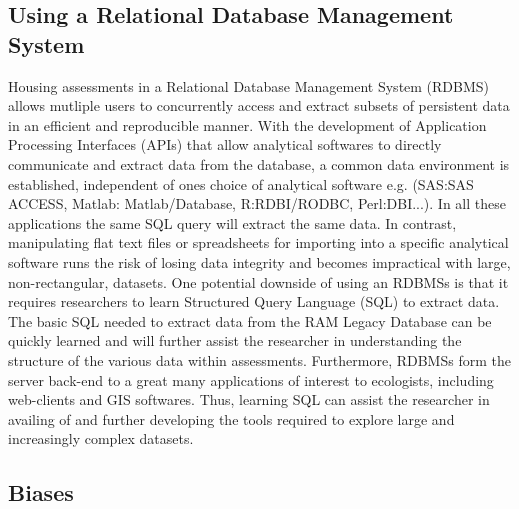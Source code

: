\documentclass[letterpaper,12pt]{article}
\begin{document}
\subsection{Using a Relational Database Management System}
Housing assessments in a Relational Database Management System (RDBMS) allows mutliple users to concurrently access and extract subsets of persistent data in an efficient and reproducible manner. With the development of Application Processing Interfaces (APIs) that allow analytical softwares to directly communicate and extract data from the database, a common data environment is established, independent of ones choice of analytical software e.g. (SAS:SAS ACCESS, Matlab: Matlab/Database, R:RDBI/RODBC, Perl:DBI...). In all these applications the same SQL query will extract the same data. In contrast, manipulating flat text files or spreadsheets for importing into a specific analytical software runs the risk of losing data integrity and becomes impractical with large, non-rectangular, datasets. One potential downside of using an RDBMSs is that it requires researchers to learn Structured Query Language (SQL) to extract data. The basic SQL needed to extract data from the RAM Legacy Database can be quickly learned and will further assist the researcher in understanding the structure of the various data within assessments. Furthermore, RDBMSs form the server back-end to a great many  applications of interest to ecologists, including web-clients and GIS softwares. Thus, learning SQL can assist the researcher in availing of and further developing the tools required to explore large and increasingly complex datasets. 

\subsection{Biases}
\end{document}
